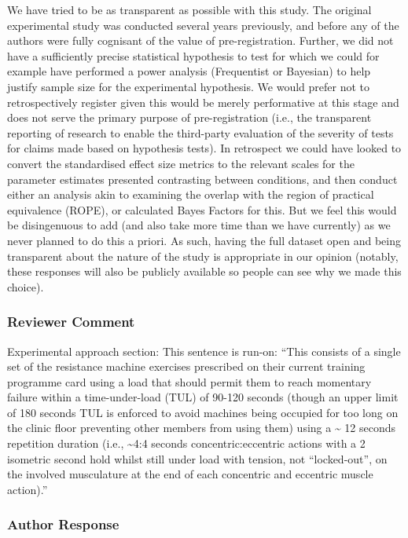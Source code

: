 \documentclass[
  letterpaper,
  DIV=11,
  numbers=noendperiod]{scrartcl}
\begin{document}
We have tried to be as transparent as possible with this study. The
original experimental study was conducted several years previously, and
before any of the authors were fully cognisant of the value of
pre-registration. Further, we did not have a sufficiently precise
statistical hypothesis to test for which we could for example have
performed a power analysis (Frequentist or Bayesian) to help justify
sample size for the experimental hypothesis. We would prefer not to
retrospectively register given this would be merely performative at this
stage and does not serve the primary purpose of pre-registration (i.e.,
the transparent reporting of research to enable the third-party
evaluation of the severity of tests for claims made based on hypothesis
tests). In retrospect we could have looked to convert the standardised
effect size metrics to the relevant scales for the parameter estimates
presented contrasting between conditions, and then conduct either an
analysis akin to examining the overlap with the region of practical
equivalence (ROPE), or calculated Bayes Factors for this. But we feel
this would be disingenuous to add (and also take more time than we have
currently) as we never planned to do this a priori. As such, having the
full dataset open and being transparent about the nature of the study is
appropriate in our opinion (notably, these responses will also be
publicly available so people can see why we made this choice).

\hypertarget{reviewer-comment-7}{%
\subsubsection{Reviewer Comment}\label{reviewer-comment-7}}

Experimental approach section: This sentence is run-on: ``This consists
of a single set of the resistance machine exercises prescribed on their
current training programme card using a load that should permit them to
reach momentary failure within a time-under-load (TUL) of 90-120 seconds
(though an upper limit of 180 seconds TUL is enforced to avoid machines
being occupied for too long on the clinic floor preventing other members
from using them) using a \textasciitilde{} 12 seconds repetition
duration (i.e., \textasciitilde4:4 seconds concentric:eccentric actions
with a 2 isometric second hold whilst still under load with tension, not
``locked-out'', on the involved musculature at the end of each
concentric and eccentric muscle action).''

\hypertarget{author-response-7}{%
\subsubsection{Author Response}\label{author-response-7}}
\end{document}
